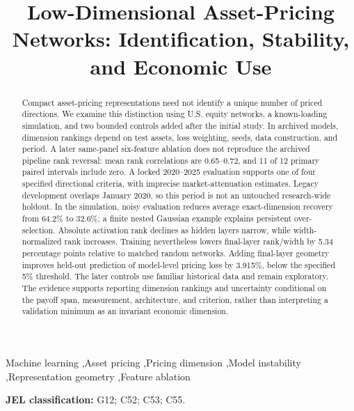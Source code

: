 \documentclass[preprint,12pt,authoryear]{elsarticle}
\begin{document}
\begin{frontmatter}
\title{Low-Dimensional Asset-Pricing Networks: Identification, Stability, and Economic Use}
\ifdefined\IRFAAUTHORED

\fi

\begin{abstract}
Compact asset-pricing representations need not identify a unique number of priced directions. We examine this distinction using U.S. equity networks, a known-loading simulation, and two bounded controls added after the initial study. In archived models, dimension rankings depend on test assets, loss weighting, seeds, data construction, and period. A later same-panel six-feature ablation does not reproduce the archived pipeline rank reversal: mean rank correlations are 0.65--0.72, and 11 of 12 primary paired intervals include zero. A locked 2020--2025 evaluation supports one of four specified directional criteria, with imprecise market-attenuation estimates. Legacy development overlaps January 2020, so this period is not an untouched research-wide holdout. In the simulation, noisy evaluation reduces average exact-dimension recovery from 64.2\% to 32.6\%; a finite nested Gaussian example explains persistent over-selection. Absolute activation rank declines as hidden layers narrow, while width-normalized rank increases. Training nevertheless lowers final-layer rank/width by 5.34 percentage points relative to matched random networks. Adding final-layer geometry improves held-out prediction of model-level pricing loss by 3.915\%, below the specified 5\% threshold. The later controls use familiar historical data and remain exploratory. The evidence supports reporting dimension rankings and uncertainty conditional on the payoff span, measurement, architecture, and criterion, rather than interpreting a validation minimum as an invariant economic dimension.
\end{abstract}

\begin{keyword}
Machine learning \sep Asset pricing \sep Pricing dimension \sep Model instability \sep Representation geometry \sep Feature ablation
\end{keyword}

\end{frontmatter}
\raggedbottom
\ifdefined\IRFAREADER\pagestyle{irfareader}\fi

\noindent\textbf{JEL classification:} G12; C52; C53; C55.








\end{document}
